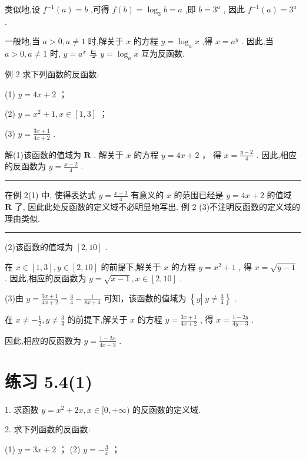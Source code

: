 \documentclass[10pt]{article}
\newcommand{\HRule}{\begin{center}\rule{0.9\linewidth}{0.2mm}\end{center}}
\begin{document}
类似地,设 \({f}^{-1}\left( a\right)  = b\) ,可得 \(f\left( b\right)  = {\log }_{3}b = a\) ,即 \(b = {3}^{a}\) , 因此 \({f}^{-1}\left( a\right)  = {3}^{a}\) .

一般地,当 \(a > 0,a \neq  1\) 时,解关于 \(x\) 的方程 \(y = {\log }_{a}x\) ,得 \(x = {a}^{y}\) . 因此,当 \(a > 0,a \neq  1\) 时, \(y = {a}^{x}\) 与 \(y = {\log }_{a}x\) 互为反函数.

例 2 求下列函数的反函数:

(1) \(y = {4x} + 2\) ；

(2) \(y = {x}^{2} + 1,x \in  \left\lbrack  {1,3}\right\rbrack\) ；

(3) \(y = \frac{{3x} + 1}{{4x} + 2}\) .

解(1)该函数的值域为 \(\mathbf{R}\) . 解关于 \(x\) 的方程 \(y = {4x} + 2\) ， 得 \(x = \frac{y - 2}{4}\) . 因此,相应的反函数为 \(y = \frac{x - 2}{4}\) .

\HRule

在例 2(1) 中, 使得表达式 \(y = \frac{x - 2}{4}\) 有意义的 \(x\) 的范围已经是 \(y = {4x} + 2\) 的值域 \(\mathbf{R}\) 了, 因此此处反函数的定义域不必明显地写出. 例 2 (3)不注明反函数的定义域的理由类似.

\HRule

(2)该函数的值域为 \(\left\lbrack  {2,{10}}\right\rbrack\) .

在 \(x \in  \left\lbrack  {1,3}\right\rbrack  ,y \in  \left\lbrack  {2,{10}}\right\rbrack\) 的前提下,解关于 \(x\) 的方程 \(y = {x}^{2} + 1\) , 得 \(x = \sqrt{y - 1}\) . 因此,相应的反函数为 \(y = \sqrt{x - 1},x \in  \left\lbrack  {2,{10}}\right\rbrack\) .

(3)由 \(y = \frac{{3x} + 1}{{4x} + 2} = \frac{3}{4} - \frac{1}{{8x} + 4}\) 可知，该函数的值域为 \(\left\{  {y\left| {\;y \neq  \frac{3}{4}}\right. }\right\}\) .

在 \(x \neq   - \frac{1}{2},y \neq  \frac{3}{4}\) 的前提下,解关于 \(x\) 的方程 \(y = \frac{{3x} + 1}{{4x} + 2}\) , 得 \(x = \frac{1 - {2y}}{{4y} - 3}\) .

因此,相应的反函数为 \(y = \frac{1 - {2x}}{{4x} - 3}\) .

\section*{练习 5.4(1)}

1. 求函数 \(y = {x}^{2} + {2x},x \in  \lbrack 0, + \infty )\) 的反函数的定义域.

2. 求下列函数的反函数:

(1) \(y = {3x} + 2\) ； (2) \(y =  - \frac{3}{x}\) ；
\end{document}
